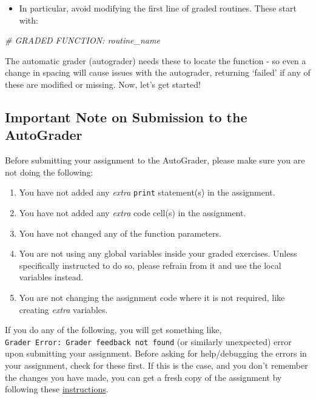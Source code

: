 \documentclass[11pt]{article}
\providecommand{\tightlist}{%
      \setlength{\itemsep}{0pt}\setlength{\parskip}{0pt}}
\newenvironment{Shaded}{}{}
\newcommand{\CommentTok}[1]{\textcolor[rgb]{0.38,0.63,0.69}{\textit{{#1}}}}
\begin{document}
\begin{itemize}
\tightlist
\item
  In particular, avoid modifying the first line of graded routines.
  These start with:
\end{itemize}

\begin{Shaded}
\begin{Highlighting}[]
\CommentTok{\# GRADED FUNCTION: routine\_name}
\end{Highlighting}
\end{Shaded}

The automatic grader (autograder) needs these to locate the function -
so even a change in spacing will cause issues with the autograder,
returning `failed' if any of these are modified or missing. Now, let's
get started!

\hypertarget{important-note-on-submission-to-the-autograder}{%
\subsection{Important Note on Submission to the
AutoGrader}\label{important-note-on-submission-to-the-autograder}}

Before submitting your assignment to the AutoGrader, please make sure
you are not doing the following:

\begin{enumerate}
\def\labelenumi{\arabic{enumi}.}
\tightlist
\item
  You have not added any \emph{extra} \texttt{print} statement(s) in the
  assignment.
\item
  You have not added any \emph{extra} code cell(s) in the assignment.
\item
  You have not changed any of the function parameters.
\item
  You are not using any global variables inside your graded exercises.
  Unless specifically instructed to do so, please refrain from it and
  use the local variables instead.
\item
  You are not changing the assignment code where it is not required,
  like creating \emph{extra} variables.
\end{enumerate}

If you do any of the following, you will get something like,
\texttt{Grader\ Error:\ Grader\ feedback\ not\ found} (or similarly
unexpected) error upon submitting your assignment. Before asking for
help/debugging the errors in your assignment, check for these first. If
this is the case, and you don't remember the changes you have made, you
can get a fresh copy of the assignment by following these
\href{https://www.coursera.org/learn/nlp-sequence-models/supplement/qHIve/h-ow-to-refresh-your-workspace}{instructions}.
\end{document}
